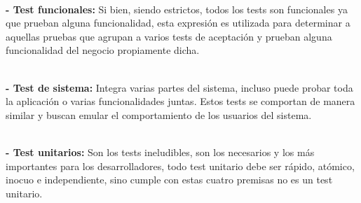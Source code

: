\begin{flushleft}
\begin{itemize}
\textbf{}\\
\textbf{- Test funcionales:} Si bien, siendo estrictos, todos los tests son funcionales ya que prueban alguna funcionalidad, esta expresión es utilizada para determinar a aquellas pruebas que agrupan a varios tests de aceptación y prueban alguna funcionalidad del negocio propiamente dicha.

\textbf{}\\
\textbf{- Test de sistema:} Integra varias partes del sistema, incluso puede probar toda la aplicación o varias funcionalidades juntas. Estos tests se comportan de manera similar y buscan emular el comportamiento de los usuarios del sistema.

\textbf{}\\
\textbf{- Test unitarios:} Son los tests ineludibles, son los necesarios y los más importantes para los desarrolladores, todo test unitario debe ser rápido, atómico, inocuo e independiente, sino cumple con estas cuatro premisas no es un test unitario.

\end{itemize} 


\end{flushleft}




